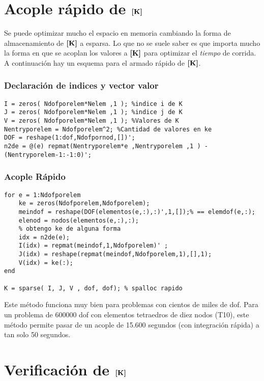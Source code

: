 \section{Acople rápido de \(\boldsymbol{[}\mathbf{K} \boldsymbol{]} \)}

Se puede optimizar mucho el espacio en memoria cambiando la forma de almacenamiento de \(\boldsymbol{[}\mathbf{K} \boldsymbol{]} \) a esparsa. Lo que no se suele saber es que importa mucho la forma en que se acoplan los valores a \(\boldsymbol{[}\mathbf{K} \boldsymbol{]} \) para optimizar el \textit{tiempo} de corrida. A continuación hay un esquema para el armado rápido de \(\boldsymbol{[}\mathbf{K} \boldsymbol{]} \).

\subsubsection*{Declaración de indices y vector valor}
\begin{lstlisting}
I = zeros( Ndofporelem*Nelem ,1 ); %indice i de K
J = zeros( Ndofporelem*Nelem ,1 ); %indice j de K
V = zeros( Ndofporelem*Nelem ,1 ); %Valores de K
Nentryporelem = Ndofporelem^2; %Cantidad de valores en ke
DOF = reshape(1:dof,Ndofpornod,[])'; 
n2de = @(e) repmat(Nentryporelem*e ,Nentryporelem ,1 ) - (Nentryporelem-1:-1:0)';
\end{lstlisting}

\subsubsection*{Acople Rápido}
\begin{lstlisting}[caption = {Aplicación del método de acople rápido de la matriz de rigidez.}]
for e = 1:Ndofporelem
    ke = zeros(Ndofporelem,Ndofporelem);
    meindof = reshape(DOF(elementos(e,:),:)',1,[]);% == elemdof(e,:);
    elenod = nodos(elementos(e,:),:);
    % obtengo ke de alguna forma
    idx = n2de(e);
    I(idx) = repmat(meindof,1,Ndofporelem)' ;
    J(idx) = reshape(repmat(meindof,Ndofporelem,1),[],1);
    V(idx) = ke(:);
end

K = sparse( I, J, V , dof, dof); % spalloc rapido
\end{lstlisting}

Este método funciona muy bien para problemas con cientos de miles de dof. Para un problema de 600000 dof con elementos tetraedros de diez nodos (T10), este método permite pasar de un acople de 15.600 segundos (con integración rápida) a tan solo 50 segundos.

\section{Verificación de \(\boldsymbol{[}\mathbf{K} \boldsymbol{]} \)}
